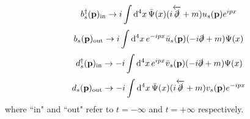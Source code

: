 \begin{equation}
    b^\dagger_s(\vb{p})_{\text{in}}\to i\int\dd^4x\,\bar{\Psi}(x)(i\overleftarrow{\slashed{\partial}}+m)u_s(\vb{p})e^{ipx}
\end{equation}
\begin{equation}
    b_s(\vb{p})_{\text{out}}\to i\int\dd^4x\,e^{-ipx}\bar{u}_s(\vb{p})(-i{\slashed{\partial}}+m)\Psi(x)
\end{equation}
\begin{equation}
    d^\dagger_s(\vb{p})_{\text{in}}\to -i\int\dd^4x\,e^{ipx}\bar{v}_s(\vb{p})(-i{\slashed{\partial}}+m)\Psi(x)
\end{equation}
\begin{equation}
    d_s(\vb{p})_{\text{out}}\to -i\int\dd^4x\,\bar{\Psi}(x)(i\overleftarrow{\slashed{\partial}}+m)v_s(\vb{p})e^{-ipx}
\end{equation}
where ``in" and ``out" refer to $t=-\infty$ and $t=+\infty$ respectively.\\

